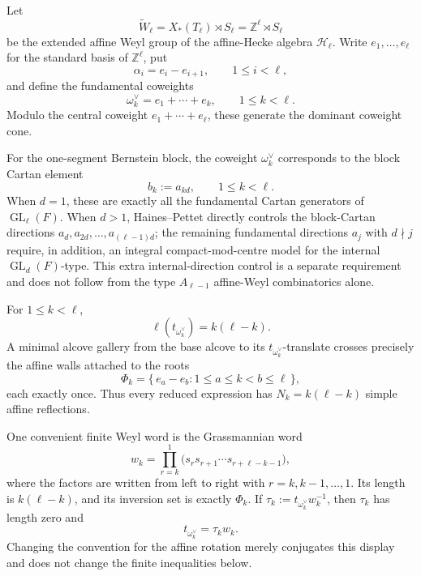 \documentclass[12pt]{article}
\theoremstyle{definition}
\theoremstyle{remark}
\DeclareMathOperator{\GL}{GL}
\begin{document}
Let
\[
 \widetilde W_\ell
 =
 X_*(T_\ell)\rtimes S_\ell
 =
 \mathbb Z^\ell\rtimes S_\ell
\]
be the extended affine Weyl group of the affine-Hecke algebra
\(\mathcal H_\ell\).  Write \(e_1,\ldots,e_\ell\) for the standard basis of
\(\mathbb Z^\ell\), put
\[
 \alpha_i=e_i-e_{i+1},
 \qquad
 1\leq i<\ell,
\]
and define the fundamental coweights
\begin{equation}\label{eq:block-fundamental-coweights}
 \omega_k^\vee
 =
 e_1+\cdots+e_k,
 \qquad
 1\leq k<\ell.
\end{equation}
Modulo the central coweight \(e_1+\cdots+e_\ell\), these generate the dominant
coweight cone.

For the one-segment Bernstein block, the coweight
\(\omega_k^\vee\) corresponds to the block Cartan element
\[
 b_k:=a_{kd},
 \qquad
 1\leq k<\ell.
\]
When \(d=1\), these are exactly all the fundamental Cartan generators of
\(\GL_\ell(F)\).  When \(d>1\), Haines--Pettet directly controls the
block-Cartan directions \(a_d,a_{2d},\ldots,a_{(\ell-1)d}\); the remaining
fundamental directions \(a_j\) with \(d\nmid j\) require, in addition, an
integral compact-mod-centre model for the internal \(\GL_d(F)\)-type.  This
extra internal-direction control is a separate requirement and does not
follow from the type \(A_{\ell-1}\) affine-Weyl combinatorics alone.

For \(1\leq k<\ell\),
\[
 \ell(t_{\omega_k^\vee})=k(\ell-k).
\]
A minimal alcove gallery from the base alcove to its
\(t_{\omega_k^\vee}\)-translate crosses precisely the affine walls attached
to the roots
\begin{equation}\label{eq:fundamental-translation-crossing-roots}
 \Phi_k
 =
 \{\,e_a-e_b:1\leq a\leq k<b\leq\ell\,\},
\end{equation}
each exactly once.  Thus every reduced expression has
\(N_k=k(\ell-k)\) simple affine reflections.

One convenient finite Weyl word is the Grassmannian word
\begin{equation}\label{eq:Grassmannian-word-fundamental}
 w_k
 =
 \prod_{r=k}^{1}
 \bigl(s_r s_{r+1}\cdots s_{r+\ell-k-1}\bigr),
\end{equation}
where the factors are written from left to right with \(r=k,k-1,\ldots,1\).
Its length is \(k(\ell-k)\), and its inversion set is exactly
\(\Phi_k\).  If \(\tau_k:=t_{\omega_k^\vee}w_k^{-1}\), then
\(\tau_k\) has length zero and
\[
 t_{\omega_k^\vee}=\tau_k w_k.
\]
Changing the convention for the affine rotation merely conjugates this
display and does not change the finite inequalities below.
\end{document}
